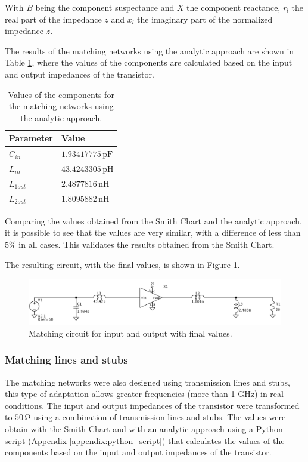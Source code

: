 With $B$ being the component suspectance and $X$ the component reactance, $r_l$ the real part of the impedance $z$ and $x_l$ the imaginary part of the  normalized impedance $z$.

The results of the matching networks using the analytic approach are shown in Table \ref{tab:MatchingValues}, where the values of the components are calculated based on the input and output impedances of the transistor.

\begin{table}[H]
    \centering
    \caption{Values of the components for the matching networks using the analytic approach.}
    \begin{tabularx}{\textwidth}{>{\centering\arraybackslash}X >{\centering\arraybackslash}X}
        \toprule
        \textbf{Parameter} & \textbf{Value} \\
        \midrule
        $C_{in}$     & $1.93417775\,\si{\pico\farad}$ \\
        \midrule
        $L_{in}$     & $43.4243305\,\si{\pico\henry}$\\
        \midrule
        $L_{1out}$   & $2.4877816\,\si{\nano\henry}$ \\
        \midrule
        $L_{2out}$   & $1.8095882\,\si{\nano\henry}$\\
        \bottomrule
    \end{tabularx}
    \label{tab:MatchingValues}
\end{table}

Comparing the values obtained from the Smith Chart and the analytic approach, it is possible to see that the values are very similar, with a difference of less than $5\%$ in all cases. This validates the results obtained from the Smith Chart.

The resulting circuit, with the final values, is shown in Figure \ref{fig:MatchingCircuit}.
\begin{figure}[H]
    \centering
    \includegraphics[width=1\textwidth]{Images/LC_matching-circuit.png}
    \caption{Matching circuit for input and output with final values.}
    \label{fig:MatchingCircuit}
\end{figure}

\subsubsection{Matching lines and stubs}
The matching networks were also designed using transmission lines and stubs, this type of adaptation allows greater frequencies (more than 1 \si{\giga \hertz}) in real conditions. The input and output impedances of the transistor were transformed to $50\,\si{\ohm}$ using a combination of transmission lines and stubs. The values were obtain with the Smith Chart and with an analytic approach using a Python script (Appendix \ref{appendix:python_script}) that calculates the values of the components based on the input and output impedances of the transistor.

